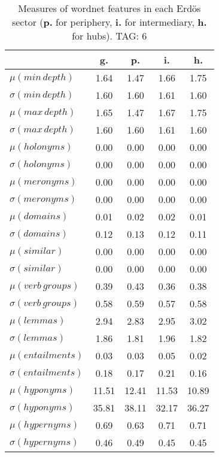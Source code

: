 \begin{table}[h!]
\begin{center}
\begin{tabular}{| l | c | c | c | c |}\hline
 & g. & p. & i. & h. \\\hline
$\mu(min\,depth)$ & 1.64  & 1.47  & 1.66  & 1.75 \\\hline
$\sigma(min\,depth)$ & 1.60  & 1.60  & 1.61  & 1.60 \\\hline
$\mu(max\,depth)$ & 1.65  & 1.47  & 1.67  & 1.75 \\\hline
$\sigma(max\,depth)$ & 1.60  & 1.60  & 1.61  & 1.60 \\\hline
$\mu(holonyms)$ & 0.00  & 0.00  & 0.00  & 0.00 \\\hline
$\sigma(holonyms)$ & 0.00  & 0.00  & 0.00  & 0.00 \\\hline
$\mu(meronyms)$ & 0.00  & 0.00  & 0.00  & 0.00 \\\hline
$\sigma(meronyms)$ & 0.00  & 0.00  & 0.00  & 0.00 \\\hline
$\mu(domains)$ & 0.01  & 0.02  & 0.02  & 0.01 \\\hline
$\sigma(domains)$ & 0.12  & 0.13  & 0.12  & 0.11 \\\hline
$\mu(similar)$ & 0.00  & 0.00  & 0.00  & 0.00 \\\hline
$\sigma(similar)$ & 0.00  & 0.00  & 0.00  & 0.00 \\\hline
$\mu(verb\,groups)$ & 0.39  & 0.43  & 0.36  & 0.38 \\\hline
$\sigma(verb\,groups)$ & 0.58  & 0.59  & 0.57  & 0.58 \\\hline
$\mu(lemmas)$ & 2.94  & 2.83  & 2.95  & 3.02 \\\hline
$\sigma(lemmas)$ & 1.86  & 1.81  & 1.96  & 1.82 \\\hline
$\mu(entailments)$ & 0.03  & 0.03  & 0.05  & 0.02 \\\hline
$\sigma(entailments)$ & 0.18  & 0.17  & 0.21  & 0.16 \\\hline
$\mu(hyponyms)$ & 11.51  & 12.41  & 11.53  & 10.89 \\\hline
$\sigma(hyponyms)$ & 35.81  & 38.11  & 32.17  & 36.27 \\\hline
$\mu(hypernyms)$ & 0.69  & 0.63  & 0.71  & 0.71 \\\hline
$\sigma(hypernyms)$ & 0.46  & 0.49  & 0.45  & 0.45 \\\hline
\end{tabular}
\caption{Measures of wordnet features in each Erd\"os sector ({{\bf p.}} for periphery, {{\bf i.}} for intermediary, {{\bf h.}} for hubs). TAG: 6}
\end{center}
\end{table}